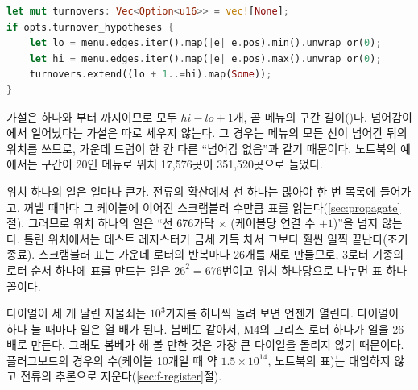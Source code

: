 \begin{lstlisting}[language=Rust,caption={\code{search.rs}: 넘어감 가설의 목록.},label={lst:s-turnovers}]
let mut turnovers: Vec<Option<u16>> = vec![None];
if opts.turnover_hypotheses {
    let lo = menu.edges.iter().map(|e| e.pos).min().unwrap_or(0);
    let hi = menu.edges.iter().map(|e| e.pos).max().unwrap_or(0);
    turnovers.extend((lo + 1..=hi).map(Some));
}
\end{lstlisting}

가설은  하나와 부터 까지이므로 모두 $\mathit{hi}-\mathit{lo}+1$개, 곧 메뉴의
구간 길이()다. 넘어감이 에서 일어났다는 가설은 따로 세우지 않는다. 그 경우는 메뉴의
모든 선이 넘어간 뒤의 위치를 쓰므로, 가운데 드럼이 한 칸 다른 ``넘어감 없음''과 같기 때문이다. 노트북의 예에서는
구간이 20인 메뉴로 위치 17,576곳이 351,520곳으로 늘었다.

\Why 위치 하나의 일은 얼마나 큰가. 전류의 확산에서 선 하나는 많아야 한 번 목록에 들어가고, 꺼낼 때마다 그
케이블에 이어진 스크램블러 수만큼 표를 읽는다(\ref{sec:propagate}절). 그러므로 위치 하나의 일은
``선 676가닥 $\times$ (케이블당 연결 수 $+1$)''을 넘지 않는다. 틀린 위치에서는 테스트 레지스터가 금세
가득 차서 그보다 훨씬 일찍 끝난다(조기 종료). 스크램블러 표는 가운데 로터의 반복마다 26개를 새로 만들므로,
3로터 기종의 로터 순서 하나에 표를 만드는 일은 $26^2 = 676$번이고 위치 하나당으로 나누면 표 하나 꼴이다.

\General 다이얼이 세 개 달린 자물쇠는 $10^3$가지를 하나씩 돌려 보면 언젠가 열린다. 다이얼이 하나 늘 때마다
일은 열 배가 된다. 봄베도 같아서, M4의 그리스 로터 하나가 일을 26배로 만든다. 그래도 봄베가 해 볼 만한 것은
가장 큰 다이얼을 돌리지 않기 때문이다. 플러그보드의 경우의 수(케이블 10개일 때 약 $1.5\times10^{14}$,
노트북의 표)는 대입하지 않고 전류의 추론으로 지운다(\ref{sec:f-register}절).

